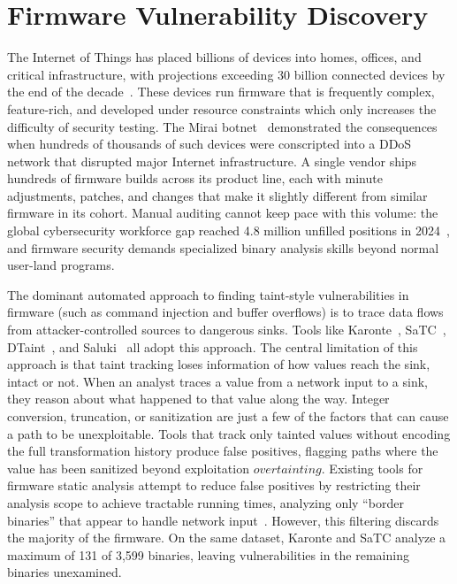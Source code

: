 \section{Firmware Vulnerability Discovery}

The Internet of Things has placed billions of devices into homes, offices, and critical infrastructure, with projections exceeding 30 billion connected
devices by the end of the decade~\cite{statista2024iot}.
These devices run firmware that is frequently complex, feature-rich, and developed under resource constraints which only increases the difficulty of security testing.
The Mirai botnet~\cite{antonakakis2017mirai} demonstrated the consequences when hundreds of thousands of such devices were conscripted into a DDoS network
that disrupted major Internet infrastructure.
A single vendor ships hundreds of firmware builds across its product line, each with minute adjustments, patches, and changes that make it slightly
different from similar firmware in its cohort.
Manual auditing cannot keep pace with this volume: the global cybersecurity workforce gap reached 4.8 million unfilled positions in
2024~\cite{isc2workforce2024}, and firmware security demands specialized binary analysis skills beyond normal user-land programs.

The dominant automated approach to finding taint-style vulnerabilities in firmware (such as command injection and buffer overflows) is to trace data
flows from attacker-controlled sources to dangerous sinks.
Tools like Karonte~\cite{karonte}, SaTC~\cite{SaTC}, DTaint~\cite{cheng2018dtaint}, and Saluki~\cite{gotovchits2018saluki} all
adopt this approach.
The central limitation of this approach is that taint tracking loses information of how values reach the sink, intact or not.
When an analyst traces a value from a network input to a sink, they reason about what happened to that value along the way.
Integer conversion, truncation, or sanitization are just a few of the factors that can cause a path to be unexploitable.
Tools that track only tainted values without encoding the full transformation history produce false positives, flagging paths where the value has been sanitized beyond exploitation \(over tainting\).
Existing tools for firmware static analysis attempt to reduce false positives by restricting their analysis scope to achieve tractable running times, analyzing only ``border binaries'' that appear to handle
network input~\cite{SaTC, karonte}.
However, this filtering discards the majority of the firmware.
On the same dataset, Karonte and SaTC analyze a maximum of 131 of 3,599 binaries, leaving vulnerabilities in the remaining binaries unexamined.

